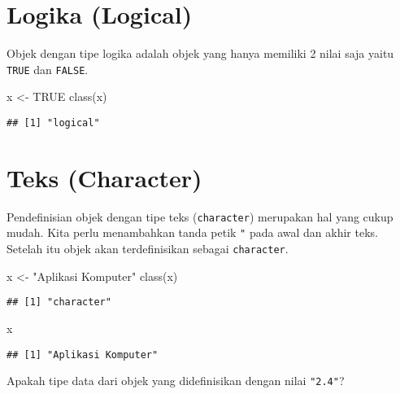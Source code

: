 \documentclass[
]{book}
\newenvironment{Shaded}{\begin{snugshade}}{\end{snugshade}}
\newcommand{\ConstantTok}[1]{\textcolor[rgb]{0.00,0.00,0.00}{#1}}
\newcommand{\FunctionTok}[1]{\textcolor[rgb]{0.00,0.00,0.00}{#1}}
\newcommand{\NormalTok}[1]{#1}
\newcommand{\OtherTok}[1]{\textcolor[rgb]{0.56,0.35,0.01}{#1}}
\newcommand{\StringTok}[1]{\textcolor[rgb]{0.31,0.60,0.02}{#1}}
\begin{document}
\hypertarget{logical}{%
\section{Logika (Logical)}\label{logical}}

Objek dengan tipe logika adalah objek yang hanya memiliki 2 nilai saja yaitu \texttt{TRUE} dan \texttt{FALSE}.

\begin{Shaded}
\begin{Highlighting}[]
\NormalTok{x }\OtherTok{\textless{}{-}} \ConstantTok{TRUE}
\FunctionTok{class}\NormalTok{(x)}
\end{Highlighting}
\end{Shaded}

\begin{verbatim}
## [1] "logical"
\end{verbatim}

\hypertarget{character}{%
\section{Teks (Character)}\label{character}}

Pendefinisian objek dengan tipe teks (\texttt{character}) merupakan hal yang cukup mudah. Kita perlu menambahkan tanda petik \texttt{"} pada awal dan akhir teks. Setelah itu objek akan terdefinisikan sebagai \texttt{character}.

\begin{Shaded}
\begin{Highlighting}[]
\NormalTok{x }\OtherTok{\textless{}{-}} \StringTok{"Aplikasi Komputer"}
\FunctionTok{class}\NormalTok{(x)}
\end{Highlighting}
\end{Shaded}

\begin{verbatim}
## [1] "character"
\end{verbatim}

\begin{Shaded}
\begin{Highlighting}[]
\NormalTok{x}
\end{Highlighting}
\end{Shaded}

\begin{verbatim}
## [1] "Aplikasi Komputer"
\end{verbatim}

Apakah tipe data dari objek yang didefinisikan dengan nilai \texttt{"2.4"}?
\end{document}
